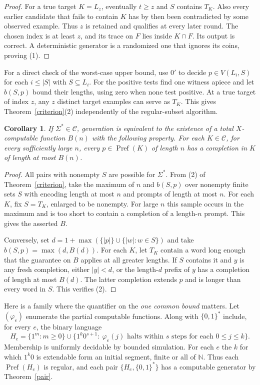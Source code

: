 \documentclass[11pt]{article}
\newtheorem{corollary}[theorem]{Corollary}
\newcommand{\Pref}{\operatorname{Pref}}
\newcommand{\Full}{\Sigma^*}
\begin{document}
\begin{proof}
For a true target $K=L_z$, eventually $t\ge z$ and $S$ contains $T_K$. Also every earlier candidate that fails to contain $K$ has by then been contradicted by some observed example. Thus $z$ is retained and qualifies at every later round. The chosen index is at least $z$, and its trace on $F$ lies inside $K\cap F$. Its output is correct. A deterministic generator is a randomized one that ignores its coins, proving (1).
\end{proof}

For a direct check of the worst-case upper bound, use $0'$ to decide $p\in V(L_i,S)$ for each $i\le |S|$ with $S\subseteq L_i$. For the positive tests find one witness apiece and let $b(S,p)$ bound their lengths, using zero when none test positive. At a true target of index $z$, any $z$ distinct target examples can serve as $T_K$. This gives Theorem~\ref{criterion}(2) independently of the regular-subset algorithm.

\begin{corollary}\label{dom}
If $\Full\in\mathcal C$, generation is equivalent to the existence of a total $X$-computable function $B(n)$ with the following property. For each $K\in\mathcal C$, for every sufficiently large $n$, every $p\in\Pref(K)$ of length $n$ has a completion in $K$ of length at most $B(n)$.
\end{corollary}
\begin{proof}
All pairs with nonempty $S$ are possible for $\Full$. From (2) of Theorem~\ref{criterion}, take the maximum of $n$ and $b(S,p)$ over nonempty finite sets $S$ with encoding length at most $n$ and prompts of length at most $n$. For each $K$, fix $S=T_K$, enlarged to be nonempty. For large $n$ this sample occurs in the maximum and is too short to contain a completion of a length-$n$ prompt. This gives the asserted $B$.

Conversely, set $d=1+\max(\{|p|\}\cup\{|w|:w\in S\})$ and take $b(S,p)=\max(d,B(d))$. For each $K$, let $T_K$ contain a word long enough that the guarantee on $B$ applies at all greater lengths. If $S$ contains it and $y$ is any fresh completion, either $|y|<d$, or the length-$d$ prefix of $y$ has a completion of length at most $B(d)$. The latter completion extends $p$ and is longer than every word in $S$. This verifies (2).
\end{proof}

Here is a family where the quantifier on the \emph{one common bound} matters. Let $(\varphi_e)$ enumerate the partial computable functions. Along with $\{0,1\}^*$ include, for every $e$, the binary language
\[
 H_e=\{1^m:m\ge0\}\cup\{1^k0^{s+1}:\ \varphi_e(j)
             \text{ halts within }s\text{ steps for each }0\le j\le k\}.
\]
Membership is uniformly decidable by bounded simulation. For each $e$ the $k$ for which $1^k0$ is extendable form an initial segment, finite or all of $\mathbb N$. Thus each $\Pref(H_e)$ is regular, and each pair $\{H_e,\{0,1\}^*\}$ has a computable generator by Theorem~\ref{pair}.
\end{document}
